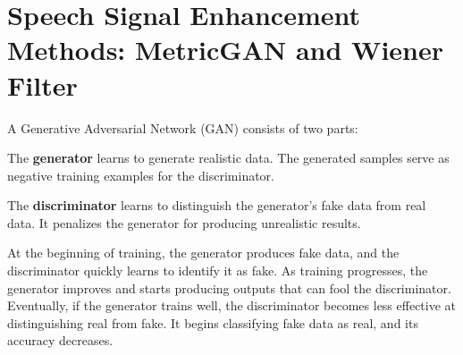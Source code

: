 





\chapter{Speech Signal Enhancement Methods: MetricGAN and Wiener Filter}
A Generative Adversarial Network (GAN) consists of two parts:

The \textbf{generator} learns to generate realistic data. The generated samples serve as negative training examples for the discriminator.

The \textbf{discriminator} learns to distinguish the generator's fake data from real data. It penalizes the generator for producing unrealistic results.

At the beginning of training, the generator produces fake data, and the discriminator quickly learns to identify it as fake.
As training progresses, the generator improves and starts producing outputs that can fool the discriminator.
Eventually, if the generator trains well, the discriminator becomes less effective at distinguishing real from fake. It begins classifying fake data as real, and its accuracy decreases.

